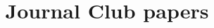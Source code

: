 \documentclass{article}
\title{Journal Club papers}
\begin{document}
  \maketitle
  \nocite{*}
  
  
\end{document}
